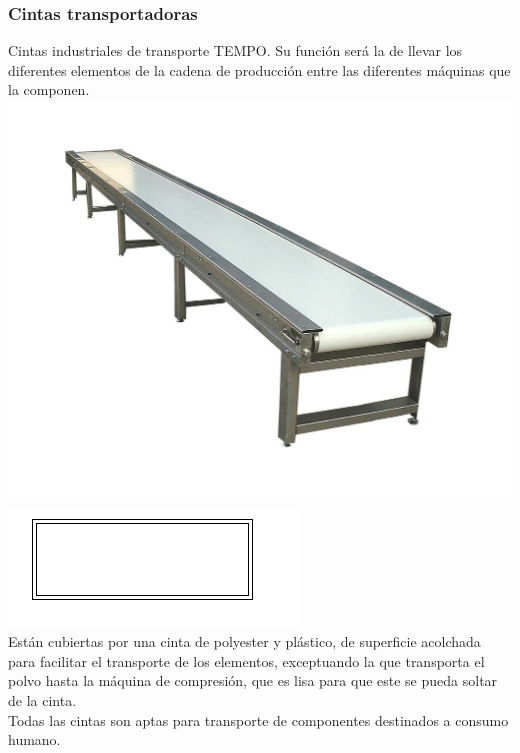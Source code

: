 \newpage


	\subsubsection{Cintas transportadoras}

	

	Cintas industriales de transporte TEMPO. Su función será la de llevar los diferentes elementos de la cadena de producción entre las diferentes máquinas que la componen. \\

	\includegraphics[scale=0.15]{Datasheets/11Foto2.png}
	\includegraphics[scale=1]{Datasheets/Miniaturas/cinta.png}\\

	Están cubiertas por una cinta de polyester y plástico, de superficie acolchada para facilitar el transporte de los elementos, exceptuando la que transporta el polvo hasta la máquina de compresión, que es lisa para que este se pueda soltar de la cinta. \\

	Todas las cintas son aptas para transporte de componentes destinados a consumo humano. 

